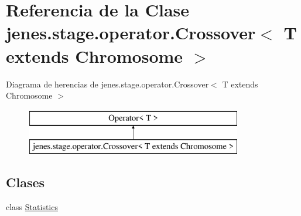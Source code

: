\hypertarget{classjenes_1_1stage_1_1operator_1_1_crossover_3_01_t_01extends_01_chromosome_01_4}{\section{Referencia de la Clase jenes.\-stage.\-operator.\-Crossover$<$ T extends Chromosome $>$}
\label{classjenes_1_1stage_1_1operator_1_1_crossover_3_01_t_01extends_01_chromosome_01_4}
}
Diagrama de herencias de jenes.\-stage.\-operator.\-Crossover$<$ T extends Chromosome $>$\begin{figure}[H]
\begin{center}
\leavevmode
\includegraphics[height=2.000000cm]{classjenes_1_1stage_1_1operator_1_1_crossover_3_01_t_01extends_01_chromosome_01_4}
\end{center}
\end{figure}
\subsection*{Clases}
\begin{DoxyCompactItemize}
\item 
class \hyperlink{classjenes_1_1stage_1_1operator_1_1_crossover_3_01_t_01extends_01_chromosome_01_4_1_1_statistics}{Statistics}
\end{DoxyCompactItemize}
